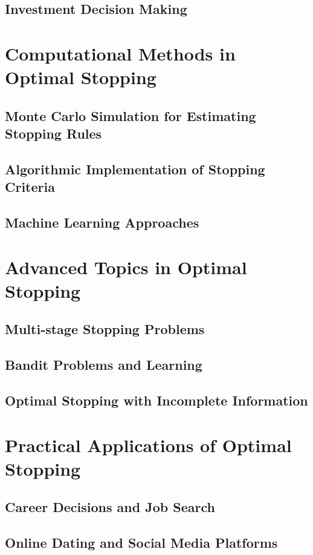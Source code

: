\documentclass[12pt]{book} %
\begin{document}
\subsection{Investment Decision Making}

\section{Computational Methods in Optimal Stopping}
\subsection{Monte Carlo Simulation for Estimating Stopping Rules}
\subsection{Algorithmic Implementation of Stopping Criteria}
\subsection{Machine Learning Approaches}

\section{Advanced Topics in Optimal Stopping}
\subsection{Multi-stage Stopping Problems}
\subsection{Bandit Problems and Learning}
\subsection{Optimal Stopping with Incomplete Information}

\section{Practical Applications of Optimal Stopping}
\subsection{Career Decisions and Job Search}
\subsection{Online Dating and Social Media Platforms}
\end{document}
